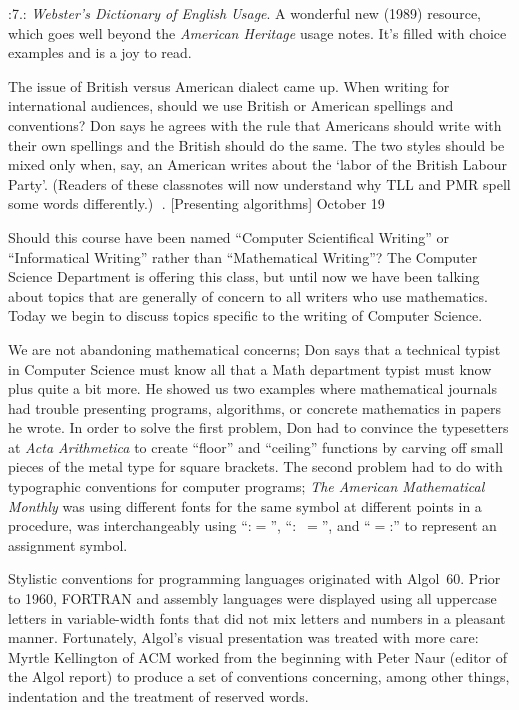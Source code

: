 \smallskip
\display 30pt:7.:
	{\sl Webster's Dictionary of English Usage}.
A wonderful new (1989) resource, which goes well beyond the
{\sl American Heritage\/} usage notes. It's filled with choice
examples and is a joy to read.

\smallskip
 The issue of British versus American dialect
came up.  When writing for international audiences, should we use
British or American spellings and conventions?
  Don says  he agrees
with the rule that Americans should write with their own spellings 
and the British should do the same.  The two styles should be mixed only
when, say,  an American
writes about the `labor of the British Labour Party'.
(Readers of these classnotes will now understand why TLL and PMR
spell some words differently.)
. [Presenting algorithms] \tll October 19

Should this course have been named ``Computer Scientifical Writing'' or
``Informatical Writing'' rather than ``Mathematical Writing''?  The Computer
Science Department is offering this class, but until now we have been
talking about topics that are generally of concern to all writers who use
mathematics. Today we begin to discuss topics
specific to the writing of Computer Science.  

We are not abandoning mathematical concerns; Don says that a technical
typist in Computer Science must know all that a Math department typist
must know plus quite a bit more.  He showed us two examples where
mathematical journals had trouble presenting programs, algorithms, or
concrete mathematics in papers he wrote.
In order to solve the first problem,  Don had to convince the typesetters
at {\sl Acta Arithmetica\/} to create ``floor'' and ``ceiling'' functions by carving
off small pieces of the metal type for square brackets.  The second
problem had to do with typographic conventions for computer programs; {\sl The
American Mathematical Monthly\/} was using different fonts for the same
symbol at different points in a procedure,  was interchangeably using
``:$=$'', ``:~$=$'', and ``$=$:'' to represent an assignment symbol.

Stylistic conventions for programming languages originated with Algol~60.
Prior to 1960, FORTRAN and assembly languages were
displayed using all uppercase letters in variable-width fonts that did not
mix letters and numbers in a pleasant manner. Fortunately, Algol's visual
presentation was treated with more care: Myrtle Kellington of ACM worked from the
beginning with Peter Naur 
(editor of the Algol report)
to produce a set of conventions concerning,
among other things, indentation and the treatment of reserved words.


